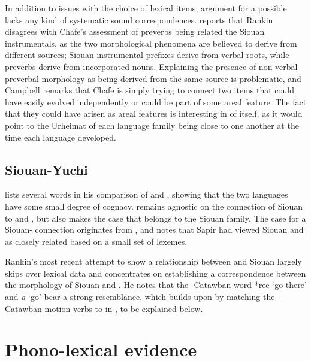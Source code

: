 \documentclass[output=paper]{LSP/langsci}
\begin{document}
In addition to issues with the choice of lexical items,  argument for a possible  lacks any kind of systematic sound correspondences. \citet{Campbell2000} reports that Rankin disagrees with Chafe's assessment of  preverbs being related the Siouan instrumentals, as the two morphological phenomena are believed to derive from different sources; Siouan instrumental prefixes derive from verbal roots, while  preverbs derive from incorporated nouns. Explaining the presence of non-verbal preverbal morphology as being derived from the same source is problematic, and Campbell remarks that Chafe is simply trying to connect two items that could have easily evolved independently or could be part of some areal feature. The fact that they could have arisen as areal features is interesting in of itself, as it would point to the Urheimat of each language family being close to one another at the time each language developed.

\subsection{Siouan-Yuchi}

\citet{Carter1980} lists several  words in his comparison of  and , showing that the two languages have some small degree of cognacy. \citet{Rankin1996,Rankin1998scy} remains agnostic on the connection of Siouan to  and , but also makes the case that  belongs to the Siouan family. The case for a Siouan- connection originates from \citet{Sapir1929}, and \citet{Haas1952} notes that Sapir had viewed Siouan and  as closely related based on a small set of lexemes.

Rankin's \citeyear{Rankin1998scy} most recent attempt to show a relationship between  and Siouan largely skips over lexical data and concentrates on establishing a correspondence between the morphology of Siouan and . He notes that the -Catawban word *ree `go there' and  \emph{\textbeltl a} `go' bear a strong resemblance, which \citet{Kasak2012,Kasak2013} builds upon by matching the -Catawban motion verbs to  in , to be explained below.

\section{Phono-lexical evidence}\label{sec:kasak:4}
\end{document}
